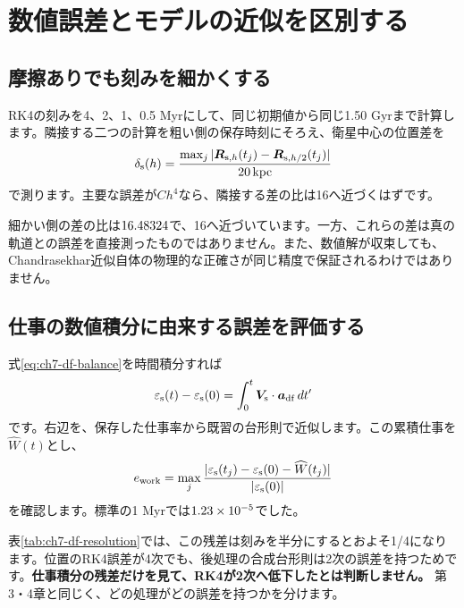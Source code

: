 \section{数値誤差とモデルの近似を区別する}
\label{sec:ch7-df-validation}
\subsection{摩擦ありでも刻みを細かくする}
RK4の刻みを4、2、1、0.5 Myrにして、同じ初期値から同じ1.50 Gyrまで計算します。隣接する二つの計算を粗い側の保存時刻にそろえ、衛星中心の位置差を
\begin{equation}
 \delta_{\rm s}(h)=\frac{\max_j|\boldsymbol R_{{\rm s},h}(t_j)-\boldsymbol R_{{\rm s},h/2}(t_j)|}{20\,\mathrm{kpc}}
 \label{eq:ch7-df-convergence}
\end{equation}
で測ります。主要な誤差が$Ch^4$なら、隣接する差の比は16へ近づくはずです。
\begin{table}[htbp]\centering\small
\caption{摩擦ありのRK4の刻み試験。「次行との差」は式\eqref{eq:ch7-df-convergence}です。最終行には比較相手がありません。$e_{\rm work}$は後処理の仕事積分を含む別の指標です。}\label{tab:ch7-df-resolution}

\end{table}

細かい側の差の比は$16.48324$で、16へ近づいています。一方、これらの差は真の軌道との誤差を直接測ったものではありません。また、数値解が収束しても、Chandrasekhar近似自体の物理的な正確さが同じ精度で保証されるわけではありません。

\subsection{仕事の数値積分に由来する誤差を評価する}
式\eqref{eq:ch7-df-balance}を時間積分すれば
\begin{equation}
 \varepsilon_{\rm s}(t)-\varepsilon_{\rm s}(0)
 =\int_0^t \boldsymbol V_{\rm s}\cdot\boldsymbol a_{\rm df}\,dt'
 \label{eq:ch7-drag-work}
\end{equation}
です。右辺を、保存した仕事率から既習の台形則で近似します。この累積仕事を$\widehat W(t)$とし、
\begin{equation}
 e_{\rm work}=\max_j\frac{|\varepsilon_{\rm s}(t_j)-\varepsilon_{\rm s}(0)-\widehat W(t_j)|}
 {|\varepsilon_{\rm s}(0)|}
 \label{eq:ch7-work-error}
\end{equation}
を確認します。標準の1 Myrでは$1.23\times 10^{-5}$でした。

表\ref{tab:ch7-df-resolution}では、この残差は刻みを半分にするとおよそ1/4になります。位置のRK4誤差が4次でも、後処理の合成台形則は2次の誤差を持つためです。\textbf{仕事積分の残差だけを見て、RK4が2次へ低下したとは判断しません。} 第3・4章と同じく、どの処理がどの誤差を持つかを分けます。

